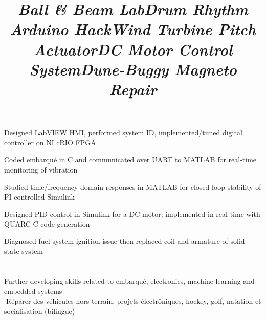 \documentclass[mm]{res}
\begin{document}
\begin{resume}

\title{\textsl{Ball \& Beam Lab}}
\begin{position}
\tb Designed LabVIEW HMI, performed system ID, implemented/tuned digital controller on NI cRIO FPGA
\end{position}

\title{\textsl{Drum Rhythm Arduino Hack}}
\begin{position}
\tb Coded embarqu\'e in C and communicated over UART to MATLAB for real-time monitoring of vibration
\end{position}

\title{\textsl{Wind Turbine Pitch Actuator}}
\begin{position}
\tb Studied time/frequency domain responses in MATLAB for closed-loop stability of PI controlled Simulink
\end{position}


\title{\textsl{DC Motor Control System}}
\begin{position}
\tb Designed PID control in Simulink for a DC motor; implemented in real-time with QUARC C code generation
\end{position}


\title{\textsl{Dune-Buggy Magneto Repair}}
\begin{position}
\tb Diagnosed fuel system ignition issue then replaced coil and armature of solid-state system
\end{position}


\toprule

\section{\headinginterests}
\tb Further developing skills related to embarqu\'e, electronics, machine learning and embedded systems\\
􏰚\tb R\'eparer des v\'ehicules hors-terrain, projets \'electr\^oniques, hockey, golf, natation et socialisation (bilingue)

\end{resume}
\end{document}
